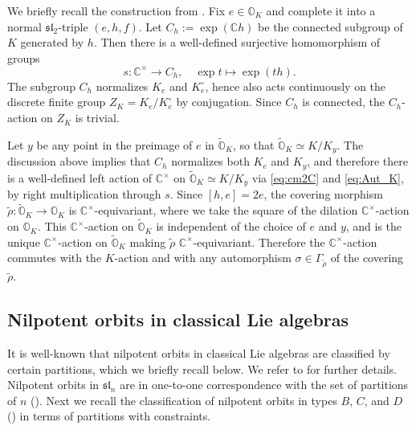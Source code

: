 \documentclass[11pt, a4paper]{amsart}
\newcommand{\C}{\mathbb{C}}
\newcommand{\orb}{\mathbb{O}}
\newcommand{\orbk}{\orb_{K}}
\newcommand{\torbk}{\widetilde{\orb}_{K}}
\newcommand{\cm}{\C^\times}
\newcommand{\slf}{\mathfrak{sl}}
\theoremstyle{definition}
\numberwithin{equation}{section}
\begin{document}
We briefly recall the construction from \cite[Section 2.4]{LY}. Fix $e \in \orbk$ and complete it into a normal $\slf_2$-triple $(e,h,f)$. Let $C_h := \exp(\C h)$ be the connected subgroup of $K$ generated by $h$. Then there is a well-defined surjective homomorphism of groups
\begin{equation}\label{eq:cm2C}
	s: \cm \to C_h, \quad \exp t \mapsto \exp(t h).
\end{equation}
The subgroup $C_h$ normalizes $K_e$ and $K_e^\circ$, hence also acts continuously on the discrete finite group $Z_K = K_e/K_e^\circ$ by conjugation. Since $C_h$ is connected, the $C_h$-action on $Z_K$ is trivial.

Let $y$ be any point in the preimage of $e$ in $\torbk$, so that $\torbk \simeq K/K_y$. The discussion above implies that $C_h$ normalizes both $K_e$ and $K_y$, and therefore there is a well-defined left action of $\cm$ on $\torbk \simeq K/K_y$ via \eqref{eq:cm2C} and \eqref{eq:Aut_K}, by right multiplication through $s$.
Since $[h,e]=2e$, the covering morphism $\tilde{\rho}: \torbk \to \orbk$ is $\cm$-equivariant, where we take the square of the dilation $\cm$-action on $\orbk$. This $\cm$-action on $\torbk$ is independent of the choice of $e$ and $y$, and is the unique $\cm$-action on $\torbk$ making $\tilde{\rho}$ $\cm$-equivariant. Therefore the $\cm$-action commutes with the $K$-action and with any automorphism $\sigma \in \Gamma_{\tilde{\rho}}$ of the covering $\tilde{\rho}$.




\subsection{Nilpotent orbits in classical Lie algebras}\label{subsec:nil_classical}


It is well-known that nilpotent orbits in classical Lie algebras are classified by certain partitions, which we briefly recall below. We refer to \cite[Section 5.1]{CM} for further details. Nilpotent orbits in $\slf_n$ are in one-to-one correspondence with the set of partitions of $n$ (\cite[Proposition 3.1.7 \& Theorem 5.1.1]{CM}). Next we recall the classification of nilpotent orbits in types $B$, $C$, and $D$ (\cite[Theorem 5.1.2--5.1.6]{CM}) in terms of partitions with constraints.
\end{document}
